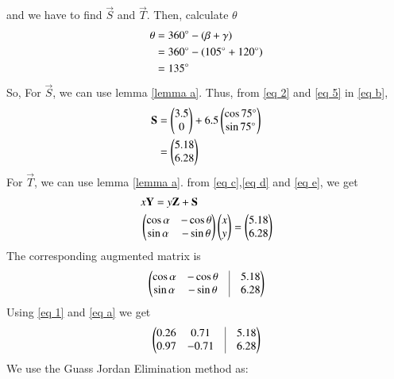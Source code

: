 \documentclass[journal,12pt,twocolumn]{IEEEtran}
\begin{document}
and we have to find $\vec{S}$ and $\vec{T}$. Then, calculate $\theta$
\begin{align}
\theta &= 360\degree - (\beta + \gamma)\\
       &= 360\degree - (105\degree + 120\degree)\\
       &= 135\degree \label{eq a}
\end{align}
So, For $\vec{S}$, we can use lemma \ref{lemma a}. Thus, from  \eqref{eq 2} and \eqref{eq 5} in \eqref{eq b},
\begin{align}
\mathbf{S} &=\begin{pmatrix}3.5\\0\end{pmatrix} + 6.5\begin{pmatrix}\cos 75\degree \\\sin 75\degree \end{pmatrix}\label{eq e}
\\
&=\begin{pmatrix}5.18\\6.28\end{pmatrix}
\end{align}
For $\vec{T}$, we can use lemma \ref{lemma a}. from \eqref{eq c},\eqref{eq d} and \eqref{eq e}, we get
\begin{align}
&x\mathbf{Y} = y\mathbf{Z}+\mathbf{S}\\
&\begin{pmatrix}\cos\alpha & -\cos\theta \\ \sin\alpha & -\sin\theta\end{pmatrix} \begin{pmatrix}x \\ y\end{pmatrix} = \begin{pmatrix}5.18\\6.28\end{pmatrix}
\end{align}
The corresponding augmented matrix is 
\begin{align}
		\myvec{
		\cos\alpha & -\cos\theta & \vrule & 5.18 \\
		\sin\alpha & -\sin\theta & \vrule & 6.28 \\
	}
\end{align}
Using \eqref{eq 1} and \eqref{eq a} we get
\begin{align}
		\myvec{
		0.26 & 0.71 & \vrule & 5.18 \\
		0.97 & -0.71 & \vrule & 6.28 \\
	}
\end{align}
We use the Guass Jordan Elimination method as:
\end{document}

